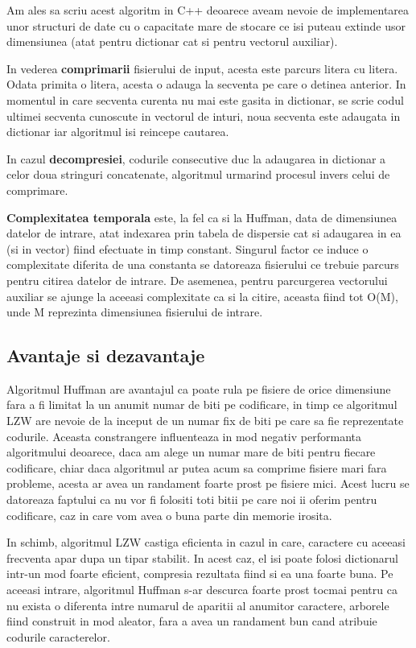 \documentclass[runningheads]{llncs}
\begin{document}
Am ales sa scriu acest algoritm in C++ deoarece aveam nevoie de implementarea unor structuri de date cu o capacitate
mare de stocare ce isi puteau extinde usor dimensiunea (atat pentru dictionar cat si pentru vectorul auxiliar).

In vederea \textbf{comprimarii} fisierului de input, acesta este parcurs litera cu litera. Odata primita o litera, acesta o adauga la secventa pe care o detinea anterior.
In momentul in care secventa curenta nu mai este gasita in dictionar, se scrie codul ultimei secventa cunoscute in vectorul de inturi,
noua secventa este adaugata in dictionar iar algoritmul isi reincepe cautarea.

In cazul \textbf{decompresiei}, codurile consecutive duc la adaugarea in dictionar a celor doua stringuri concatenate, algoritmul urmarind procesul invers celui de comprimare.

\textbf{Complexitatea temporala} este, la fel ca si la Huffman, data de dimensiunea datelor de intrare, atat indexarea prin tabela de dispersie cat si adaugarea in ea (si in vector)
fiind efectuate in timp constant. Singurul factor ce induce o complexitate diferita de una constanta se datoreaza fisierului
ce trebuie parcurs pentru citirea datelor de intrare. De asemenea, pentru parcurgerea vectorului auxiliar se ajunge la aceeasi complexitate ca si la citire, aceasta fiind tot
O(M), unde M reprezinta dimensiunea fisierului de intrare.


\subsection*{Avantaje si dezavantaje}
Algoritmul Huffman are avantajul ca poate rula pe fisiere de orice dimensiune fara a fi limitat la un anumit numar de biti pe codificare, in timp ce
algoritmul LZW are nevoie de la inceput de un numar fix de biti pe care sa fie reprezentate codurile.
Aceasta constrangere influenteaza in mod negativ performanta  algoritmului deoarece, daca am alege un numar mare de biti pentru fiecare codificare, chiar daca algoritmul ar putea acum
sa comprime fisiere mari fara probleme, acesta ar avea un randament foarte prost pe fisiere mici. Acest lucru se datoreaza faptului ca nu vor fi folositi toti bitii pe care noi ii oferim
pentru codificare, caz in care vom avea o buna parte din memorie irosita.

In schimb, algoritmul LZW castiga eficienta in cazul in care, caractere cu aceeasi frecventa apar dupa un tipar stabilit. In acest caz, el isi poate folosi dictionarul intr-un mod foarte eficient,
compresia rezultata fiind si ea una foarte buna. Pe aceeasi intrare, algoritmul Huffman s-ar descurca foarte prost tocmai pentru ca nu exista o diferenta intre numarul de aparitii al anumitor
caractere, arborele fiind construit in mod aleator, fara a avea un randament bun cand atribuie codurile caracterelor.
\end{document}
